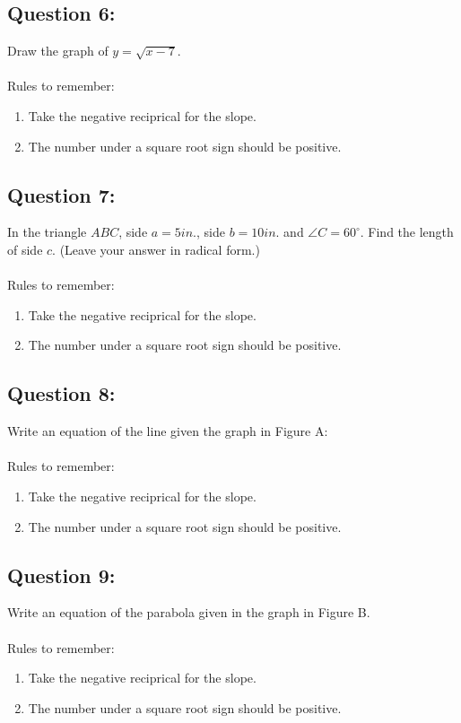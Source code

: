 \documentclass[12pt, letterpaper]{article}
\begin{document}
\subsection{Question 6:}
  Draw the graph of $y=\sqrt{x-7}$.
  \\\\

  Rules to remember:
  \begin{enumerate}
    \item Take the negative reciprical for the slope.
    \item The number under a square root sign should be positive.
  \end{enumerate}

\subsection{Question 7:}
  In the triangle $ABC$, side $a=5in.$, side $b=10in.$ and $\angle C=60^\circ$.
  Find the length of side $c$. (Leave your answer in radical form.) 
  \\\\
  Rules to remember:
  \begin{enumerate}
    \item Take the negative reciprical for the slope.
    \item The number under a square root sign should be positive.
  \end{enumerate}

\subsection{Question 8:}
  Write an equation of the line given the graph in Figure A:
  \\\\
  Rules to remember:
  \begin{enumerate}
    \item Take the negative reciprical for the slope.
    \item The number under a square root sign should be positive.
  \end{enumerate}

\subsection{Question 9:}
  Write an equation of the parabola given in the graph in Figure B. 
  \\\\
  Rules to remember:
  \begin{enumerate}
    \item Take the negative reciprical for the slope.
    \item The number under a square root sign should be positive.
  \end{enumerate}
\end{document}
